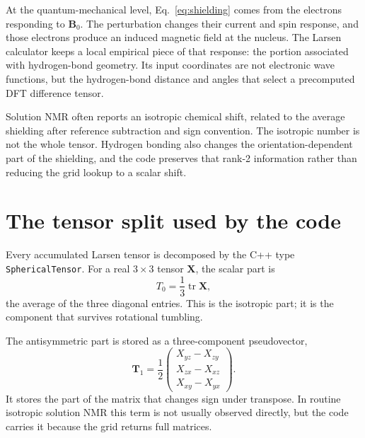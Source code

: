 \documentclass[11pt]{article}
\begin{document}
At the quantum-mechanical level, Eq.~\eqref{eq:shielding} comes from the
electrons responding to \(\bm B_0\). The perturbation changes their current and
spin response, and those electrons produce an induced magnetic field at the
nucleus. The Larsen calculator keeps a local empirical piece of that response:
the portion associated with hydrogen-bond geometry. Its input coordinates are
not electronic wave functions, but the hydrogen-bond distance and angles that
select a precomputed DFT difference tensor.

Solution NMR often reports an isotropic chemical shift, related to the average
shielding after reference subtraction and sign convention. The isotropic
number is not the whole tensor. Hydrogen bonding also changes the
orientation-dependent part of the shielding, and the code preserves that
rank-2 information rather than reducing the grid lookup to a scalar shift.

\section{The tensor split used by the code}

Every accumulated Larsen tensor is decomposed by the C++ type
\texttt{SphericalTensor}. For a real \(3\times 3\) tensor \(\bm X\), the scalar
part is
\begin{equation}
  T_0 = \frac{1}{3}\operatorname{tr}\bm X ,
  \label{eq:t0}
\end{equation}
the average of the three diagonal entries. This is the isotropic part; it is
the component that survives rotational tumbling.

The antisymmetric part is stored as a three-component pseudovector,
\begin{equation}
  \bm T_1 =
  \frac{1}{2}
  \begin{pmatrix}
    X_{yz}-X_{zy}\\
    X_{zx}-X_{xz}\\
    X_{xy}-X_{yx}
  \end{pmatrix}.
  \label{eq:t1}
\end{equation}
It stores the part of the matrix that changes sign under transpose. In routine
isotropic solution NMR this term is not usually observed directly, but the
code carries it because the grid returns full matrices.
\end{document}
